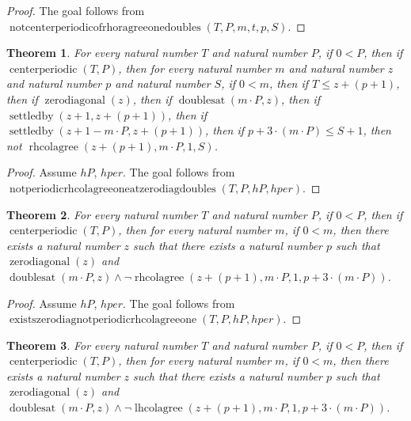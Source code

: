 \documentclass[11pt]{article}
\newtheorem{theorem}{Theorem}[section]
\theoremstyle{definition}
\begin{document}
\begin{proof}
The goal follows from \(\operatorname{notcenterperiodicofrhoragreeonedoubles}(T, P, m, t, p, S)\).
\end{proof}
\begin{theorem}
\label{ll:paper:not-periodic-rhcolagree-one-at-zero-diag-doubles}
For every natural number \(T\) and natural number \(P\), if \(0 < P\), then if \(\operatorname{centerperiodic}(T, P)\), then for every natural number \(m\) and natural number \(z\) and natural number \(p\) and natural number \(S\), if \(0 < m\), then if \(T \le z + (p + 1)\), then if \(\operatorname{zerodiagonal}(z)\), then if \(\operatorname{doublesat}(m \cdot P, z)\), then if \(\operatorname{settledby}(z + 1, z + (p + 1))\), then if \(\operatorname{settledby}(z + 1 - m \cdot P, z + (p + 1))\), then if \(p + 3 \cdot (m \cdot P) \le S + 1\), then not \(\operatorname{rhcolagree}(z + (p + 1), m \cdot P, 1, S)\).
\end{theorem}
\begin{proof}
Assume \(hP\), \(hper\).
The goal follows from \(\operatorname{notperiodicrhcolagreeoneatzerodiagdoubles}(T, P, hP, hper)\).
\end{proof}
\begin{theorem}
\label{ll:paper:exists-zero-diag-not-periodic-rhcolagree-one}
For every natural number \(T\) and natural number \(P\), if \(0 < P\), then if \(\operatorname{centerperiodic}(T, P)\), then for every natural number \(m\), if \(0 < m\), then there exists a natural number \(z\) such that there exists a natural number \(p\) such that \(\operatorname{zerodiagonal}(z)\) and \(\operatorname{doublesat}(m \cdot P, z) \land \lnot\operatorname{rhcolagree}(z + (p + 1), m \cdot P, 1, p + 3 \cdot (m \cdot P))\).
\end{theorem}
\begin{proof}
Assume \(hP\), \(hper\).
The goal follows from \(\operatorname{existszerodiagnotperiodicrhcolagreeone}(T, P, hP, hper)\).
\end{proof}
\begin{theorem}
\label{ll:paper:exists-zero-diag-not-periodic-lhcolagree-one}
For every natural number \(T\) and natural number \(P\), if \(0 < P\), then if \(\operatorname{centerperiodic}(T, P)\), then for every natural number \(m\), if \(0 < m\), then there exists a natural number \(z\) such that there exists a natural number \(p\) such that \(\operatorname{zerodiagonal}(z)\) and \(\operatorname{doublesat}(m \cdot P, z) \land \lnot\operatorname{lhcolagree}(z + (p + 1), m \cdot P, 1, p + 3 \cdot (m \cdot P))\).
\end{theorem}
\end{document}
